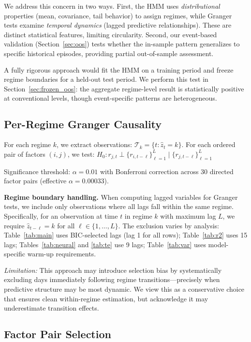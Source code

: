 \documentclass{uai2026}
\begin{document}
We address this concern in two ways. First, the HMM uses \emph{distributional}
properties (mean, covariance, tail behavior) to assign regimes, while Granger
tests examine \emph{temporal dynamics} (lagged predictive relationships). These
are distinct statistical features, limiting circularity. Second, our event-based
validation (Section~\ref{sec:oos}) tests whether the in-sample pattern generalizes
to specific historical episodes, providing partial out-of-sample assessment.

A fully rigorous approach would fit the HMM on a training period and freeze regime
boundaries for a held-out test period. We perform this test in
Section~\ref{sec:frozen_oos}: the aggregate regime-level result is statistically
positive at conventional levels, though event-specific patterns are heterogeneous.

\subsection{Per-Regime Granger Causality}

For each regime $k$, we extract observations: $\mathcal{T}_k = \{t : \hat{z}_t = k\}$.
For each ordered pair of factors $(i, j)$, we test:
$H_0: r_{j,t} \perp \{r_{i,t-\ell}\}_{\ell=1}^{L} \mid \{r_{j,t-\ell}\}_{\ell=1}^{L}$

Significance threshold: $\alpha = 0.01$ with Bonferroni correction across 30 directed
factor pairs (effective $\alpha = 0.00033$).

\textbf{Regime boundary handling.} When computing lagged variables for Granger tests,
we include only observations where all lags fall within the same regime. Specifically,
for an observation at time $t$ in regime $k$ with maximum lag $L$, we require
$\hat{z}_{t-\ell} = k$ for all $\ell \in \{1, \ldots, L\}$. The exclusion varies
by analysis: Table~\ref{tab:main} uses BIC-selected lags (lag 1 for all rows);
Table~\ref{tab:r2} uses 15 lags; Tables~\ref{tab:neural} and \ref{tab:te} use
9 lags; Table~\ref{tab:var} uses model-specific warm-up requirements.

\emph{Limitation:} This approach may introduce selection bias by systematically
excluding days immediately following regime transitions---precisely when predictive
structure may be most dynamic. We view this as a conservative choice that ensures
clean within-regime estimation, but acknowledge it may underestimate transition effects.

\subsection{Factor Pair Selection}
\end{document}
